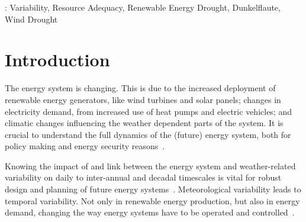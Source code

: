 \documentclass[12pt]{iopart}
\begin{document}
\vspace{2pc}
: Variability, Resource Adequacy, Renewable Energy Drought, Dunkelflaute, Wind Drought

\submitto{\ERL}

\maketitle




\section{Introduction}
The energy system is changing. 
This is due to the increased deployment of renewable energy generators, like wind turbines and solar panels; changes in electricity demand, from increased use of heat pumps and electric vehicles; and climatic changes influencing the weather dependent parts of the system. 
It is crucial to understand the full dynamics of the (future) energy system, both for policy making and energy security reasons~\autocite{craig2022disconnect}.

Knowing the impact of and link between the energy system and weather-related variability on daily to inter-annual and decadal timescales is vital for robust design and planning of future energy systems~\autocite{Bloomfield2021nextgen,craig2022disconnect,McKenna2022}. 
Meteorological variability leads to temporal variability. 
Not only in renewable energy production, but also in energy demand, changing the way energy systems have to be operated and controlled~\autocite{craig2022disconnect}.
\end{document}
